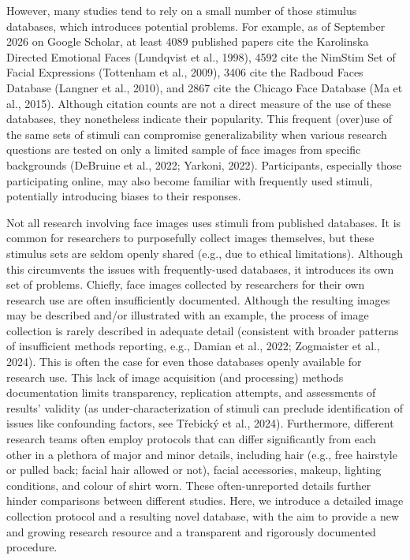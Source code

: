 \documentclass[
  letterpaper,
  DIV=11,
  numbers=noendperiod]{scrartcl}
\newcounter{none} %
\begin{document}
However, many studies tend to rely on a small number of those stimulus
databases, which introduces potential problems. For example, as of
September 2026 on Google Scholar, at least 4089 published papers cite
the Karolinska Directed Emotional Faces (Lundqvist et al., 1998), 4592
cite the NimStim Set of Facial Expressions (Tottenham et al., 2009),
3406 cite the Radboud Faces Database (Langner et al., 2010), and 2867
cite the Chicago Face Database (Ma et al., 2015). Although citation
counts are not a direct measure of the use of these databases, they
nonetheless indicate their popularity. This frequent (over)use of the
same sets of stimuli can compromise generalizability when various
research questions are tested on only a limited sample of face images
from specific backgrounds (DeBruine et al., 2022; Yarkoni, 2022).
Participants, especially those participating online, may also become
familiar with frequently used stimuli, potentially introducing biases to
their responses.

Not all research involving face images uses stimuli from published
databases. It is common for researchers to purposefully collect images
themselves, but these stimulus sets are seldom openly shared (e.g., due
to ethical limitations). Although this circumvents the issues with
frequently-used databases, it introduces its own set of problems.
Chiefly, face images collected by researchers for their own research use
are often insufficiently documented. Although the resulting images may
be described and/or illustrated with an example, the process of image
collection is rarely described in adequate detail (consistent with
broader patterns of insufficient methods reporting, e.g., Damian et al.,
2022; Zogmaister et al., 2024). This is often the case for even those
databases openly available for research use. This lack of image
acquisition (and processing) methods documentation limits transparency,
replication attempts, and assessments of results' validity (as
under-characterization of stimuli can preclude identification of issues
like confounding factors, see Třebický et al., 2024). Furthermore,
different research teams often employ protocols that can differ
significantly from each other in a plethora of major and minor details,
including hair (e.g., free hairstyle or pulled back; facial hair allowed
or not), facial accessories, makeup, lighting conditions, and colour of
shirt worn. These often-unreported details further hinder comparisons
between different studies. Here, we introduce a detailed image
collection protocol and a resulting novel database, with the aim to
provide a new and growing research resource and a transparent and
rigorously documented procedure.
\end{document}
